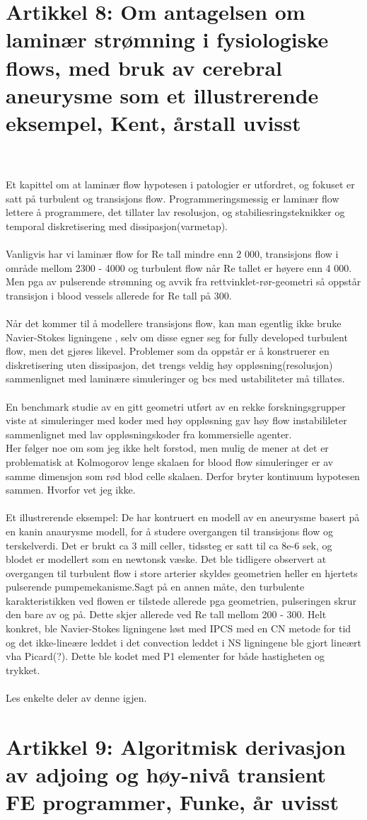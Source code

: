 \documentclass{article}
\begin{document}
\section{ Artikkel 8: Om antagelsen om laminær strømning i fysiologiske flows, med bruk av cerebral aneurysme som et illustrerende eksempel, Kent, årstall uvisst}
\\
\\Et kapittel om at laminær flow hypotesen i patologier er utfordret, og fokuset er satt på turbulent og transisjons flow. 
Programmeringsmessig er laminær flow lettere å programmere, det tillater lav resolusjon, og stabiliesringsteknikker og temporal diskretisering med dissipasjon(varmetap). 
\\
\\Vanligvis har vi laminær flow for Re tall mindre enn 2 000, transisjons flow i område mellom 2300 - 4000 og turbulent flow når Re tallet er høyere enn 4 000. Men pga av pulserende strømning og avvik fra rettvinklet-rør-geometri så oppstår transisjon i blood vessels allerede for Re tall på 300. 
\\
\\Når det kommer til å modellere transisjons flow, kan man egentlig ikke bruke Navier-Stokes ligningene , selv om disse egner seg for fully developed turbulent flow, men det gjøres likevel. 
Problemer som da oppstår er å konstruerer en diskretisering uten dissipasjon, det trengs veldig høy oppløsning(resolusjon) sammenlignet med laminære simuleringer og bcs med ustabiliteter må tillates. 
\\
\\En benchmark studie av en gitt geometri utført av en rekke forskningsgrupper viste at simuleringer med koder med høy oppløsning gav høy flow instabilileter  sammenlignet med lav oppløsningskoder fra kommersielle agenter. 
\\Her følger noe om som jeg ikke helt forstod, men mulig de mener at det er problematisk at Kolmogorov lenge skalaen for blood flow simuleringer er av samme dimensjon som rød blod celle skalaen. Derfor bryter kontinuum hypotesen sammen. Hvorfor vet jeg ikke. 
\\
\\Et illustrerende eksempel: De har kontruert en modell av en aneurysme basert på en kanin anaurysme modell, for å studere overgangen til transisjons flow og terskelverdi. Det er brukt ca 3 mill celler, tidssteg er satt til ca 8e-6 sek, og blodet er modellert som en newtonsk væske. Det ble tidligere observert at overgangen til turbulent flow i store arterier skyldes geometrien heller en hjertets pulserende pumpemekanisme.Sagt på en annen måte, den turbulente karakteristikken ved flowen er tilstede allerede pga geometrien, pulseringen skrur den bare av og på. Dette skjer allerede ved Re tall mellom 200 - 300. 
Helt konkret, ble Navier-Stokes ligningene løst med IPCS med en CN metode for tid og det ikke-lineære leddet i det convection leddet i NS ligningene ble gjort lineært vha Picard(?). Dette ble kodet med P1 elementer for både hastigheten og trykket. 
\\
\\Les enkelte deler av denne igjen. 

\section{Artikkel 9: Algoritmisk derivasjon av adjoing og høy-nivå transient FE programmer, Funke, år uvisst}
\end{document}
